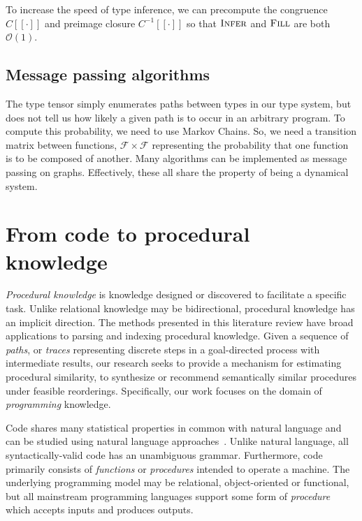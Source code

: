 \documentclass[11pt]{article}
\begin{document}
    To increase the speed of type inference, we can precompute the congruence $C[\![\cdot]\!]$ and preimage closure $C^{-1}[\![\cdot]\!]$ so that $\textsc{Infer}$ and $\textsc{Fill}$ are both $\mathcal{O}(1)$.

    \subsection{Message passing algorithms}\label{subsec:message-passing-algorithms}

    The type tensor simply enumerates paths between types in our type system, but does not tell us how likely a given path is to occur in an arbitrary program. To compute this probability, we need to use Markov Chains. So, we need a transition matrix between functions, $\mathcal{F}\times\mathcal{F}$ representing the probability that one function is to be composed of another. Many algorithms can be implemented as message passing on graphs. Effectively, these all share the property of being a dynamical system.

    \pagebreak\section{From code to procedural knowledge}\label{sec:applications}

    \textit{Procedural knowledge} is knowledge designed or discovered to facilitate a specific task. Unlike relational knowledge may be bidirectional, procedural knowledge has an implicit direction. The methods presented in this literature review have broad applications to parsing and indexing procedural knowledge. Given a sequence of \textit{paths}, or \textit{traces} representing discrete steps in a goal-directed process with intermediate results, our research seeks to provide a mechanism for estimating procedural similarity, to synthesize or recommend semantically similar procedures under feasible reorderings. Specifically, our work focuses on the domain of \textit{programming} knowledge.

    Code shares many statistical properties in common with natural language and can be studied using natural language approaches~\cite{hindle2012naturalness}. Unlike natural language, all syntactically-valid code has an unambiguous grammar. Furthermore, code primarily consists of \textit{functions} or \textit{procedures} intended to operate a machine. The underlying programming model may be relational, object-oriented or functional, but all mainstream programming languages support some form of \textit{procedure} which accepts inputs and produces outputs.
\end{document}
